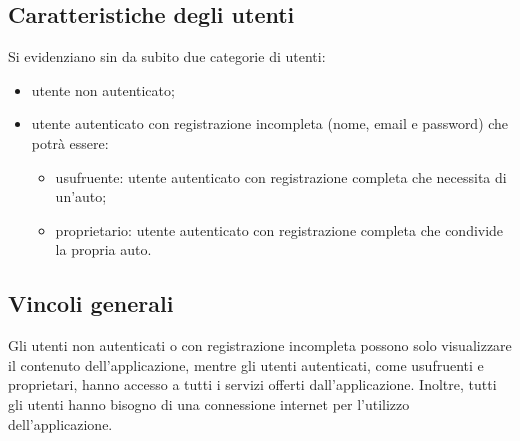 \subsection{Caratteristiche degli utenti}
Si evidenziano sin da subito due categorie di utenti:
\begin{itemize}
	\item utente non autenticato;
	\item utente autenticato con registrazione incompleta (nome, email e password) che potrà essere:
		\begin{itemize}
			\item usufruente: utente autenticato con registrazione completa che necessita di un'auto;
			\item proprietario: utente autenticato con registrazione completa che condivide la propria auto.
		\end{itemize}
\end{itemize}

\subsection{Vincoli generali}
Gli utenti non autenticati o con registrazione incompleta possono solo visualizzare il contenuto dell'applicazione, mentre gli utenti autenticati, come usufruenti e proprietari, hanno accesso a tutti i servizi offerti dall'applicazione. Inoltre, tutti gli utenti hanno bisogno di una connessione internet per l'utilizzo dell'applicazione.

 
